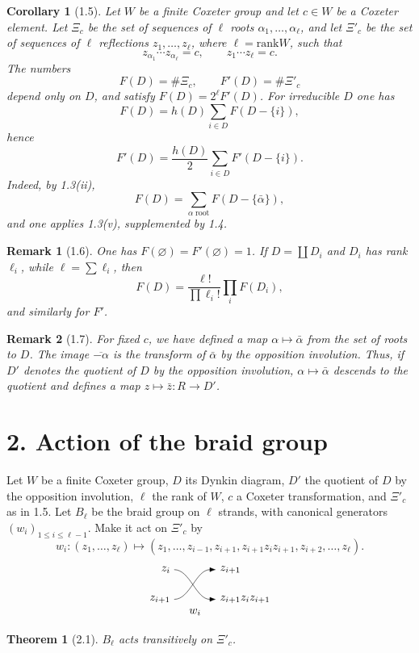 \documentclass[11pt]{article}
\newcommand{\braidMoveSketch}{%
\begin{tikzpicture}[scale=.9,baseline=-.5ex]
  \draw[-{Latex[length=2mm]}] (0,.75) node[left]{$z_i$} .. controls (.55,.75) and (.75,-.28) .. (1.45,-.28) node[right]{$z_{i+1}z_i z_{i+1}$};
  \draw[-{Latex[length=2mm]}] (0,-.28) node[left]{$z_{i+1}$} .. controls (.55,-.28) and (.75,.75) .. (1.45,.75) node[right]{$z_{i+1}$};
  \node at (.72,-.72){$w_i$};
\end{tikzpicture}%
}
\newcommand{\card}{\#}
\newcommand{\rank}{\mathrm{rank}}
\theoremstyle{plainen}
\newtheorem*{theoremx}{Theorem}
\newtheorem*{corollaryx}{Corollary}
\newtheorem*{remarkx}{Remark}
\begin{document}
\begin{corollaryx}[1.5]
Let $W$ be a finite Coxeter group and let $c\in W$ be a Coxeter element. Let $\Xi_c$ be the set of sequences of $\ell$ roots $\alpha_1,\ldots,\alpha_\ell$, and let $\Xi'_c$ be the set of sequences of $\ell$ reflections $z_1,\ldots,z_\ell$, where $\ell=\rank W$, such that
\[
 z_{\alpha_1}\cdots z_{\alpha_\ell}=c,
 \qquad z_1\cdots z_\ell=c.
\]
The numbers
\[
 F(D)=\card\Xi_c,
 \qquad F'(D)=\card\Xi'_c
\]
depend only on $D$, and satisfy $F(D)=2^\ell F'(D)$. For irreducible $D$ one has
\[
 F(D)=h(D)\sum_{i\in D}F(D-\{i\}),
\]
hence
\[
 F'(D)=\frac{h(D)}{2}\sum_{i\in D}F'(D-\{i\}).
\]
Indeed, by 1.3(ii),
\[
 F(D)=\sum_{\alpha\;\mathrm{root}}F(D-\{\bar\alpha\}),
\]
and one applies 1.3(v), supplemented by 1.4.
\end{corollaryx}

\begin{remarkx}[1.6]
One has $F(\varnothing)=F'(\varnothing)=1$. If $D=\coprod D_i$ and $D_i$ has rank $\ell_i$, while $\ell=\sum\ell_i$, then
\[
 F(D)=\frac{\ell!}{\prod\ell_i!}\prod_i F(D_i),
\]
and similarly for $F'$.
\end{remarkx}

\begin{remarkx}[1.7]
For fixed $c$, we have defined a map $\alpha\mapsto\bar\alpha$ from the set of roots to $D$. The image $\overline{-\alpha}$ is the transform of $\bar\alpha$ by the opposition involution. Thus, if $D'$ denotes the quotient of $D$ by the opposition involution, $\alpha\mapsto\bar\alpha$ descends to the quotient and defines a map $z\mapsto\bar z:R\to D'$.
\end{remarkx}

\section*{2. Action of the braid group}

Let $W$ be a finite Coxeter group, $D$ its Dynkin diagram, $D'$ the quotient of $D$ by the opposition involution, $\ell$ the rank of $W$, $c$ a Coxeter transformation, and $\Xi'_c$ as in 1.5. Let $B_\ell$ be the braid group on $\ell$ strands, with canonical generators $(w_i)_{1\le i\le \ell-1}$. Make it act on $\Xi'_c$ by
\[
 w_i:(z_1,\ldots,z_\ell)\longmapsto (z_1,\ldots,z_{i-1},z_{i+1},z_{i+1}z_i z_{i+1},z_{i+2},\ldots,z_\ell).
\]
\[
\braidMoveSketch
\]

\begin{theoremx}[2.1]
$B_\ell$ acts transitively on $\Xi'_c$.
\end{theoremx}
\end{document}
